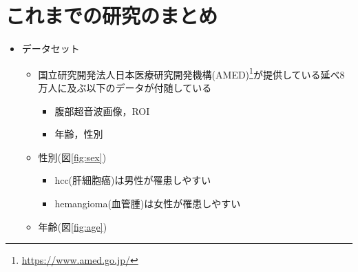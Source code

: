 \documentclass[a4j]{ujarticle}
\newcommand{\Fref}[1]{\mbox{図\ref{fig:#1}}}
\begin{document}
	\section{これまでの研究のまとめ}
		\begin{itemize}
			\item データセット
			\begin{itemize}
				\item 国立研究開発法人日本医療研究開発機構(AMED)\footnote{\url{https://www.amed.go.jp/}}が提供している延べ8万人に及ぶ以下のデータが付随している
				\begin{itemize}
					\item 腹部超音波画像，ROI
					\item 年齢，性別
				\end{itemize}
			\end{itemize}
			\begin{figure}[h]
				\centering
			\end{figure}
			\begin{itemize}
				\item 性別(\Fref{sex})
				\begin{itemize}
					\item hcc(肝細胞癌)は男性が罹患しやすい
					\item hemangioma(血管腫)は女性が罹患しやすい
				\end{itemize}
				\item 年齢(\Fref{age})

\end{itemize}
\end{itemize}
\end{document}
